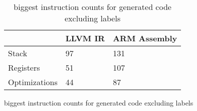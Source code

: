 \begin{table}[h!]
\centering
\begin{tabular}{p{}p{}p{}}
  \hline
 & LLVM IR & ARM Assembly \\ 
  \hline
Stack &  97 & 131 \\ 
  Registers &  51 & 107 \\ 
  Optimizations &  44 &  87 \\ 
   \hline
\end{tabular}
\caption{biggest instruction counts for generated code excluding labels}
\caption{biggest instruction counts for generated code excluding labels}
\end{table}
